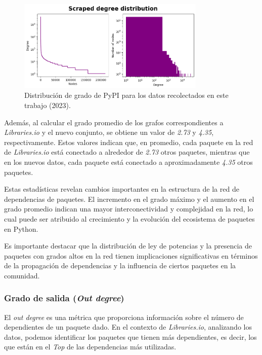 \begin{figure}[ht!]
    \begin{center}
        \includegraphics[width=0.8\textwidth]{img/pypi/scraped_degree_distribution.png}
        \caption{Distribución de grado de PyPI para los datos recolectados en este trabajo (2023).}
        \label{fig:pypi_scraped_degree_distribution}
    \end{center}
\end{figure}

Además, al calcular el grado promedio de los grafos correspondientes a \textit{Libraries.io} y el nuevo
conjunto, se obtiene un valor de \textit{2.73} y \textit{4.35}, respectivamente. Estos valores indican
que, en promedio, cada paquete en la red de \textit{Libraries.io} está conectado a alrededor de
\textit{2.73} otros paquetes, mientras que en los nuevos datos, cada paquete está conectado a
aproximadamente \textit{4.35} otros paquetes.

Estas estadísticas revelan cambios importantes en la estructura de la red de dependencias de paquetes.
El incremento en el grado máximo y el aumento en el grado promedio indican una mayor interconectividad
y complejidad en la red, lo cual puede ser atribuido al crecimiento y la evolución del ecosistema de
paquetes en Python.

Es importante destacar que la distribución de ley de potencias y la presencia de paquetes con grados
altos en la red tienen implicaciones significativas en términos de la propagación de dependencias y la
influencia de ciertos paquetes en la comunidad.

\subsubsection{Grado de salida (\textit{Out degree})}

El \textit{out degree} es una métrica que proporciona información
sobre el número de dependientes de un paquete dado. En el contexto de \textit{Libraries.io},
analizando los datos, podemos identificar los paquetes que tienen más dependientes, es decir,
los que están en el \textit{Top} de las dependencias más utilizadas.

